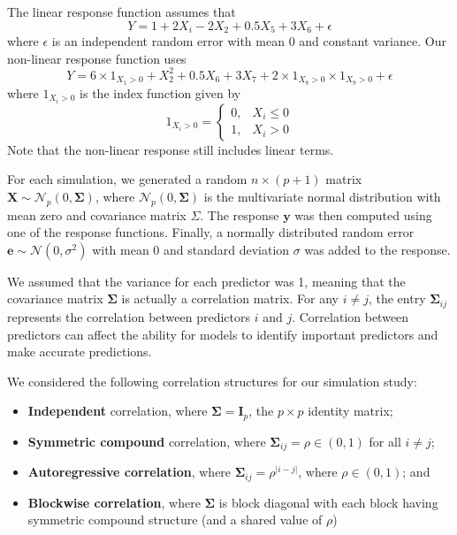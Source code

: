 \documentclass{article}
\begin{document}
	The linear response function assumes that
	\begin{equation}\label{eqn:linear-response}
		Y = 1 + 2X_i - 2X_2 + 0.5X_5 + 3X_6 + \epsilon
	\end{equation}
	where $\epsilon$ is an independent random error with mean 0 and constant variance. Our non-linear response function uses
	\begin{equation}\label{eqn:nonlinear-response}
		Y = 6\times 1_{X_1 > 0} + X_2^2 + 0.5X_6 + 3X_7 + 2\times 1_{X_8 > 0}\times 1_{X_9>0} + \epsilon
	\end{equation}
	where $1_{X_i>0}$ is the index function given by
	\begin{equation}
		1_{X_i > 0} = \left\{\begin{array}{rl}
			0, & X_i \leq 0 \\
			1, & X_i > 0
		\end{array}\right.
	\end{equation}
	Note that the non-linear response still includes linear terms.
	
	For each simulation, we generated a random $n\times (p + 1)$ matrix $\mathbf{X}\sim \mathcal{N}_p(0, \mathbf{\Sigma})$, where $\mathcal{N}_p(0, \mathbf{\Sigma})$ is the multivariate normal distribution with mean zero and covariance matrix $\Sigma$. The response $\mathbf{y}$ was then computed using one of the response functions. Finally, a normally distributed random error $\mathbf{e}\sim \mathcal{N}(0, \sigma^2)$ with mean 0 and standard deviation $\sigma$ was added to the response.
	
	We assumed that the variance for each predictor was 1, meaning that the covariance matrix $\mathbf{\Sigma}$ is actually a correlation matrix. For any $i \neq j$, the entry $\mathbf{\Sigma}_{ij}$ represents the correlation between predictors $i$ and $j$. Correlation between predictors can affect the ability for models to identify important predictors and make accurate predictions.
	
	We considered the following correlation structures for our simulation study:
	\begin{itemize}\itemsep0pt
		\item \textbf{Independent} correlation, where $\mathbf{\Sigma} = \mathbf{I}_p$, the $p\times p$ identity matrix;
		\item \textbf{Symmetric compound} correlation, where $\mathbf{\Sigma}_{ij} = \rho \in (0, 1)$ for all $i \neq j$;
		\item \textbf{Autoregressive correlation}, where $\mathbf{\Sigma}_{ij} = \rho^{\vert i - j \vert}$, where $\rho \in (0, 1)$; and
		\item \textbf{Blockwise correlation}, where $\mathbf{\Sigma}$ is block diagonal with each block having symmetric compound structure (and a shared value of $\rho$)
	\end{itemize}
	
\end{document}
